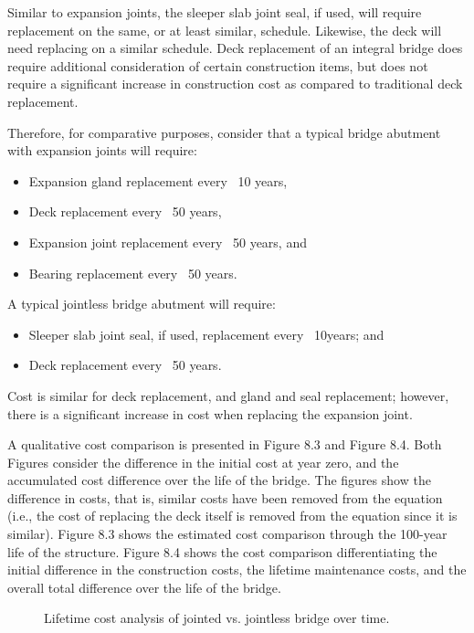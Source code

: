 Similar to expansion joints, the sleeper slab joint seal, if used, will require replacement on the same, or at least
similar, schedule. Likewise, the deck will need replacing on a similar schedule. Deck replacement of an integral
bridge does require additional consideration of certain construction items, but does not require a significant increase
in construction cost as compared to traditional deck replacement.

Therefore, for comparative purposes, consider that a typical bridge abutment with expansion joints will require:

\begin{itemize}
  \item Expansion gland replacement every ~10 years,
  \item Deck replacement every ~50 years,
  \item Expansion joint replacement every ~50 years, and
  \item Bearing replacement every ~50 years.
\end{itemize}

A typical jointless bridge abutment will require:

\begin{itemize}
  \item Sleeper slab joint seal, if used, replacement every ~10years; and
  \item Deck replacement every ~50 years.
\end{itemize}

Cost is similar for deck replacement, and gland and seal replacement; however, there is a significant increase in
cost when replacing the expansion joint.

A qualitative cost comparison is presented in Figure 8.3 and Figure 8.4. Both Figures consider the difference in
the initial cost at year zero, and the accumulated cost difference over the life of the bridge. The figures show the
difference in costs, that is, similar costs have been removed from the equation (i.e., the cost of replacing the deck
itself is removed from the equation since it is similar). Figure 8.3 shows the estimated cost comparison through the
100-year life of the structure. Figure 8.4 shows the cost comparison differentiating the initial difference in the
construction costs, the lifetime maintenance costs, and the overall total difference over the life of the bridge.

\begin{figure}
  \caption{Lifetime cost analysis of jointed vs. jointless bridge over time.}\label{fig:life-cost-time}
\end{figure}


